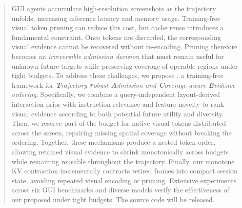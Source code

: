 \begin{abstract}
GUI agents accumulate high-resolution screenshots as the trajectory unfolds, increasing inference latency and memory usage.
%
Training-free visual token pruning can reduce this cost, but cache reuse introduces a fundamental constraint.
%
Once tokens are discarded, the corresponding visual evidence cannot be recovered without re-encoding.
%
Pruning therefore becomes an \textit{irreversible admission decision} that must remain useful for unknown future targets while preserving coverage of operable regions under tight budgets.
%
To address these challenges, we propose \textbf{\method{}}, a training-free framework for \emph{\textbf{T}rajectory-\textbf{r}obust \textbf{A}dmission and \textbf{C}overage-aware \textbf{E}vidence ordering}.
%
Specifically, we combine a query-independent layout-derived interaction prior with instruction relevance and feature novelty to rank visual evidence according to both potential future utility and diversity.
%
Then, we reserve part of the budget for native visual tokens distributed across the screen, repairing missing spatial coverage without breaking the ordering.
%
Together, these mechanisms produce a nested token order, allowing retained visual evidence to shrink monotonically across budgets while remaining reusable throughout the trajectory.
%
Finally, our monotone KV contraction incrementally contracts retired frames into compact session state, avoiding repeated visual encoding or pruning.
%
Extensive experiments across six GUI benchmarks and diverse models verify the effectiveness of our proposed \method{} under tight budgets.
%
The source code will be released.
\end{abstract}
